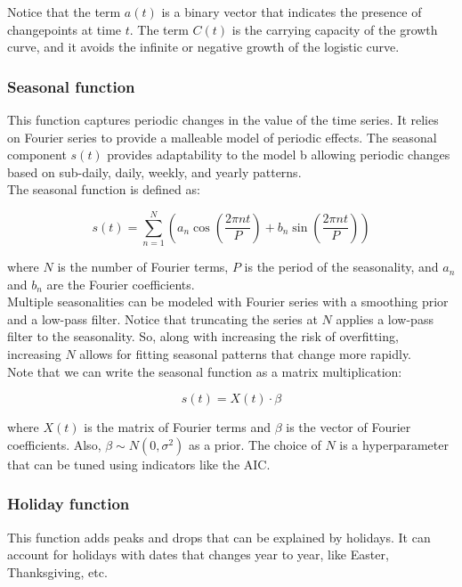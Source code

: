 Notice that the term $a(t)$ is a binary vector that indicates the presence of changepoints
at time $t$. The term $C(t)$ is the carrying capacity of the growth curve, and it avoids
the infinite or negative growth of the logistic curve. 

\subsubsection{Seasonal function}

This function captures periodic changes in the value of the time series. It relies on
Fourier series to provide a malleable model of periodic effects. The seasonal component
$s(t)$ provides adaptability to the model b allowing periodic changes based on sub-daily,
daily, weekly, and yearly patterns.\\

The seasonal function is defined as:

$$s(t) = \sum_{n=1}^N \left(a_n \cos\left( \frac{2 \pi nt}{P} \right) + b_n \sin\left( \frac{2 \pi nt}{P} \right) \right)$$

where $N$ is the number of Fourier terms, $P$ is the period of the seasonality, and $a_n$
and $b_n$ are the Fourier coefficients.\\

Multiple seasonalities can be modeled with Fourier series with a smoothing prior and 
a low-pass filter. Notice that truncating the series at $N$ applies a low-pass filter
to the seasonality. So, along with increasing the risk of overfitting, increasing $N$
allows for fitting seasonal patterns that change more rapidly.\\

Note that we can write the seasonal function as a matrix multiplication:

$$s(t) = X(t) \cdot \beta$$

where $X(t)$ is the matrix of Fourier terms and $\beta$ is the vector of Fourier coefficients.
Also, $\beta \sim N(0, \sigma^2)$ as a prior. The choice of $N$ is a hyperparameter that 
can be tuned using indicators like the AIC.

\subsubsection{Holiday function}

This function adds peaks and drops that can be explained by holidays. It can account for 
holidays with dates that changes year to year, like Easter, Thanksgiving, etc.\\

